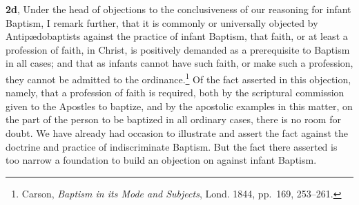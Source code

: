 \documentclass[
  english,
]{book}
\begin{document}
\textbf{2d}, Under the head of objections to the conclusiveness of our reasoning for infant Baptism, I remark further, that it is commonly or universally objected by Antipædobaptists against the practice of infant Baptism, that faith, or at least a profession of faith, in Christ, is positively demanded as a prerequisite to Baptism in all cases; and that as infants cannot have such faith, or make such a profession, they cannot be admitted to the ordinance.\footnote{Carson, \emph{Baptism in its Mode and Subjects}, Lond. 1844, pp.~169, 253--261.} Of the fact asserted in this objection, namely, that a profession of faith is required, both by the scriptural commission given to the Apostles to baptize, and by the apostolic examples in this matter, on the part of the person to be baptized in all ordinary cases, there is no room for doubt. We have already had occasion to illustrate and assert the fact against the doctrine and practice of indiscriminate Baptism. But the fact there asserted is too narrow a foundation to build an objection on against infant Baptism.
\end{document}
